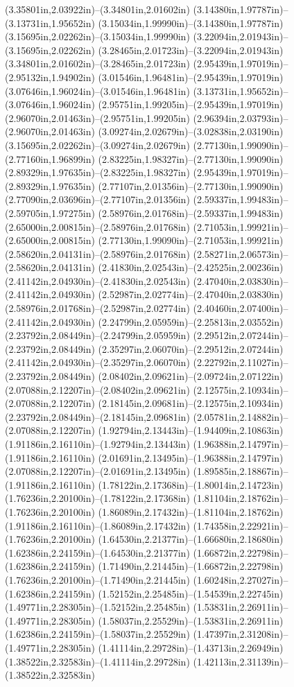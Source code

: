 (3.35801in,2.03922in)--(3.34801in,2.01602in) (3.14380in,1.97787in)--(3.13731in,1.95652in) (3.15034in,1.99990in)--(3.14380in,1.97787in) (3.15695in,2.02262in)--(3.15034in,1.99990in) (3.22094in,2.01943in)--(3.15695in,2.02262in) (3.28465in,2.01723in)--(3.22094in,2.01943in) (3.34801in,2.01602in)--(3.28465in,2.01723in) (2.95439in,1.97019in)--(2.95132in,1.94902in) (3.01546in,1.96481in)--(2.95439in,1.97019in) (3.07646in,1.96024in)--(3.01546in,1.96481in) (3.13731in,1.95652in)--(3.07646in,1.96024in) (2.95751in,1.99205in)--(2.95439in,1.97019in) (2.96070in,2.01463in)--(2.95751in,1.99205in) (2.96394in,2.03793in)--(2.96070in,2.01463in) (3.09274in,2.02679in)--(3.02838in,2.03190in) (3.15695in,2.02262in)--(3.09274in,2.02679in) (2.77130in,1.99090in)--(2.77160in,1.96899in) (2.83225in,1.98327in)--(2.77130in,1.99090in) (2.89329in,1.97635in)--(2.83225in,1.98327in) (2.95439in,1.97019in)--(2.89329in,1.97635in) (2.77107in,2.01356in)--(2.77130in,1.99090in) (2.77090in,2.03696in)--(2.77107in,2.01356in) (2.59337in,1.99483in)--(2.59705in,1.97275in) (2.58976in,2.01768in)--(2.59337in,1.99483in) (2.65000in,2.00815in)--(2.58976in,2.01768in) (2.71053in,1.99921in)--(2.65000in,2.00815in) (2.77130in,1.99090in)--(2.71053in,1.99921in) (2.58620in,2.04131in)--(2.58976in,2.01768in) (2.58271in,2.06573in)--(2.58620in,2.04131in) (2.41830in,2.02543in)--(2.42525in,2.00236in) (2.41142in,2.04930in)--(2.41830in,2.02543in) (2.47040in,2.03830in)--(2.41142in,2.04930in) (2.52987in,2.02774in)--(2.47040in,2.03830in) (2.58976in,2.01768in)--(2.52987in,2.02774in) (2.40460in,2.07400in)--(2.41142in,2.04930in) (2.24799in,2.05959in)--(2.25813in,2.03552in) (2.23792in,2.08449in)--(2.24799in,2.05959in) (2.29512in,2.07244in)--(2.23792in,2.08449in) (2.35297in,2.06070in)--(2.29512in,2.07244in) (2.41142in,2.04930in)--(2.35297in,2.06070in) (2.22792in,2.11027in)--(2.23792in,2.08449in) (2.08402in,2.09621in)--(2.09724in,2.07122in) (2.07088in,2.12207in)--(2.08402in,2.09621in) (2.12575in,2.10934in)--(2.07088in,2.12207in) (2.18145in,2.09681in)--(2.12575in,2.10934in) (2.23792in,2.08449in)--(2.18145in,2.09681in) (2.05781in,2.14882in)--(2.07088in,2.12207in) (1.92794in,2.13443in)--(1.94409in,2.10863in) (1.91186in,2.16110in)--(1.92794in,2.13443in) (1.96388in,2.14797in)--(1.91186in,2.16110in) (2.01691in,2.13495in)--(1.96388in,2.14797in) (2.07088in,2.12207in)--(2.01691in,2.13495in) (1.89585in,2.18867in)--(1.91186in,2.16110in) (1.78122in,2.17368in)--(1.80014in,2.14723in) (1.76236in,2.20100in)--(1.78122in,2.17368in) (1.81104in,2.18762in)--(1.76236in,2.20100in) (1.86089in,2.17432in)--(1.81104in,2.18762in) (1.91186in,2.16110in)--(1.86089in,2.17432in) (1.74358in,2.22921in)--(1.76236in,2.20100in) (1.64530in,2.21377in)--(1.66680in,2.18680in) (1.62386in,2.24159in)--(1.64530in,2.21377in) (1.66872in,2.22798in)--(1.62386in,2.24159in) (1.71490in,2.21445in)--(1.66872in,2.22798in) (1.76236in,2.20100in)--(1.71490in,2.21445in) (1.60248in,2.27027in)--(1.62386in,2.24159in) (1.52152in,2.25485in)--(1.54539in,2.22745in) (1.49771in,2.28305in)--(1.52152in,2.25485in) (1.53831in,2.26911in)--(1.49771in,2.28305in) (1.58037in,2.25529in)--(1.53831in,2.26911in) (1.62386in,2.24159in)--(1.58037in,2.25529in) (1.47397in,2.31208in)--(1.49771in,2.28305in) (1.41114in,2.29728in)--(1.43713in,2.26949in) (1.38522in,2.32583in)--(1.41114in,2.29728in) (1.42113in,2.31139in)--(1.38522in,2.32583in) 